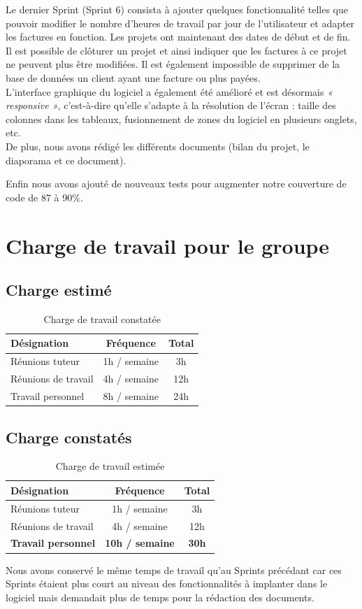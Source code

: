\documentclass[12pt,a4paper,openany]{article}
\begin{document}
	Le dernier Sprint (Sprint 6) consista à ajouter quelques fonctionnalité telles que pouvoir modifier le nombre d'heures de travail par jour de l'utilisateur et adapter les factures en fonction. Les projets ont maintenant des dates de début et de fin. Il est possible de clôturer un projet et ainsi indiquer que les factures à ce projet ne peuvent plus être modifiées. Il est également impossible de supprimer de la base de données un client ayant une facture ou plus payées. \\
	L'interface graphique du logiciel a également été amélioré et est désormais \textit{« responsive »}, c'est-à-dire qu'elle s'adapte à la résolution de l'écran : taille des colonnes dans les tableaux, fusionnement de zones du logiciel en plusieurs onglets, etc. \\
	De plus, nous avons rédigé les différents documents (bilan du projet, le diaporama et ce document). 
	
	Enfin nous avons ajouté de nouveaux tests pour augmenter notre couverture de code de 87 à 90\%.   
	
	\section{Charge de travail pour le groupe}
	\subsection{Charge estimé}
	\begin{table}[H]
		\centering
		\begin{tabular}{l|c|c}
			\textbf{Désignation} & \textbf{Fréquence} & \textbf{Total}\\
			\hline
			Réunions tuteur & 1h / semaine & 3h\\
			Réunions de travail & 4h / semaine & 12h\\
			Travail personnel & 8h / semaine & 24h
		\end{tabular}
		\caption{Charge de travail constatée}
	\end{table}

	\subsection{Charge constatés}
	\begin{table}[H]
		\centering
		\begin{tabular}{l|c|c}
			\textbf{Désignation} & \textbf{Fréquence} & \textbf{Total}\\
			\hline
			Réunions tuteur & 1h / semaine & 3h\\
			Réunions de travail & 4h / semaine & 12h\\
			\textbf{Travail personnel} & \textbf{10h / semaine} & \textbf{30h}
		\end{tabular}
		\caption{Charge de travail estimée}
	\end{table}
	Nous avons conservé le même temps de travail qu'au Sprints précédant car ces Sprints étaient plus court au niveau des fonctionnalités à implanter dans le logiciel mais demandait plus de temps pour la rédaction des documents.  
\end{document}
